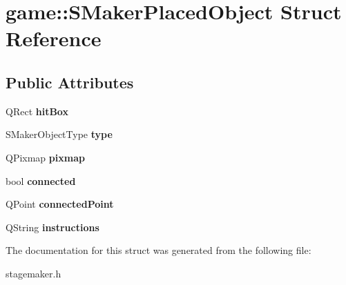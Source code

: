 \hypertarget{structgame_1_1SMakerPlacedObject}{}\section{game\+:\+:S\+Maker\+Placed\+Object Struct Reference}
\label{structgame_1_1SMakerPlacedObject}
\subsection*{Public Attributes}
\begin{DoxyCompactItemize}
\item 
\mbox{\label{structgame_1_1SMakerPlacedObject_a0e5abd288aee052079c1b7c6be43a41a}} 
Q\+Rect {\bfseries hit\+Box}
\item 
\mbox{\label{structgame_1_1SMakerPlacedObject_a26c241e7e27c53141fe94d6e3f0ce427}} 
S\+Maker\+Object\+Type {\bfseries type}
\item 
\mbox{\label{structgame_1_1SMakerPlacedObject_aac05c41b7e6ceee2918b5768425df092}} 
Q\+Pixmap {\bfseries pixmap}
\item 
\mbox{\label{structgame_1_1SMakerPlacedObject_a48ae9cd156af2a331caeda4cd0883564}} 
bool {\bfseries connected}
\item 
\mbox{\label{structgame_1_1SMakerPlacedObject_a2cf5fc2086cd06e75beabe8369f4eb52}} 
Q\+Point {\bfseries connected\+Point}
\item 
\mbox{\label{structgame_1_1SMakerPlacedObject_a6f0f44d4b86e6fc7ffcf50ed46d04d13}} 
Q\+String {\bfseries instructions}
\end{DoxyCompactItemize}


The documentation for this struct was generated from the following file\+:\begin{DoxyCompactItemize}
\item 
stagemaker.\+h\end{DoxyCompactItemize}

